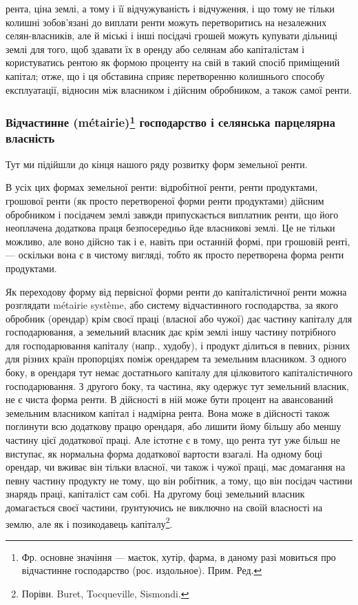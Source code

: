 \parcont{}  %
рента, ціна землі, а тому і її відчужуваність і відчуження, і що тому не тільки
колишні зобов’язані до виплати ренти можуть перетворитись на незалежних
селян-власників, але й міські і інші посідачі грошей можуть купувати дільниці
землі для того, щоб здавати їх в оренду або селянам або капіталістам
і користуватись рентою як формою проценту на свій в такий спосіб приміщений
капітал; отже, що і ця обставина сприяє перетворенню колишнього способу
експлуатації, відносин між власником і дійсним обробником, а також самої ренти.

\subsubsection{Відчастинне (métairie)\footnote*{
Фр. основне значіння — маєток, хутір, фарма, в даному разі мовиться про відчастинне
господарство (рос. издольное). Прим. Ред.
} господарство і селянська парцелярна
власність}

Тут ми підійшли до кінця нашого ряду розвитку форм земельної ренти.

В усіх цих формах земельної ренти: відробітної ренти, ренти продуктами,
грошової ренти (як просто перетвореної форми ренти продуктами) дійсним
обробником і посідачем землі завжди припускається виплатник ренти, що його
неоплачена додаткова праця безпосередньо йде власникові землі. Це не тільки
можливо, але воно дійсно так і е, навіть при останній формі, при грошовій
ренті, — оскільки вона є в чистому вигляді, тобто як просто перетворена форма
ренти продуктами.

Як переходову форму від первісної форми ренти до капіталістичної ренти
можна розглядати métairie système, або систему відчастинного господарства, за якого
обробник (орендар) крім своєї праці (власної або чужої) дає частину капіталу
для господарювання, а земельний власник дає крім землі іншу частину потрібного
для господарювання капіталу (напр., худобу), і продукт ділиться в певних,
різних для різних країн пропорціях поміж орендарем та земельним власником.
З одного боку, в орендаря тут немає достатнього капіталу для цілковитого капіталістичного
господарювання. З другого боку, та частина, яку одержує тут
земельний власник, не є чиста форма ренти. В дійсності в ній може бути процент
на авансований земельним власником капітал і надмірна рента. Вона може
в дійсності також поглинути всю додаткову працю орендаря, або лишити йому
більшу або меншу частину цієї додаткової праці. Але істотне є в тому, що
рента тут уже більш не виступає, як нормальна форма додаткової вартости взагалі.
На одному боці орендар, чи вживає він тільки власної, чи також і чужої праці,
має домагання на певну частину продукту не тому, що він робітник, а тому,
що він посідач частини знарядь праці, капіталіст сам собі. На другому боці
земельний власник домагається своєї частини, ґрунтуючись не виключно на
своїй власності на землю, але як і позикодавець капіталу\footnote{
Порівн. Buret, Tocqueville, Sismondi.
}.

